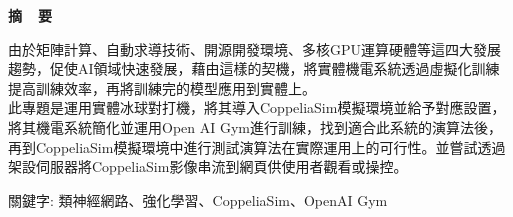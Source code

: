 \renewcommand{\baselinestretch}{1.5} %
\clearpage  %
\sectionef
{} %
\begin{center}
\LARGE\textbf{摘~~要}\\
\end{center}
\begin{flushleft}
\fontsize{14pt}{20pt}\sectionef\hspace{12pt}\quad 由於矩陣計算、自動求導技術、開源開發環境、多核GPU運算硬體等這四大發展趨勢，促使AI領域快速發展，藉由這樣的契機，將實體機電系統透過虛擬化訓練提高訓練效率，再將訓練完的模型應用到實體上。\\[12pt]

\fontsize{14pt}{20pt}\sectionef\hspace{12pt}\quad 此專題是運用實體冰球對打機，將其導入CoppeliaSim模擬環境並給予對應設置，將其機電系統簡化並運用Open AI Gym進行訓練，找到適合此系統的演算法後，再到CoppeliaSim模擬環境中進行測試演算法在實際運用上的可行性。並嘗試透過架設伺服器將CoppeliaSim影像串流到網頁供使用者觀看或操控。\\[12pt]

\end{flushleft}
\begin{center}
\fontsize{14pt}{20pt}\selectfont 關鍵字: 類神經網路、強化學習、\sectionef CoppeliaSim、OpenAI Gym
\end{center}
\newpage


